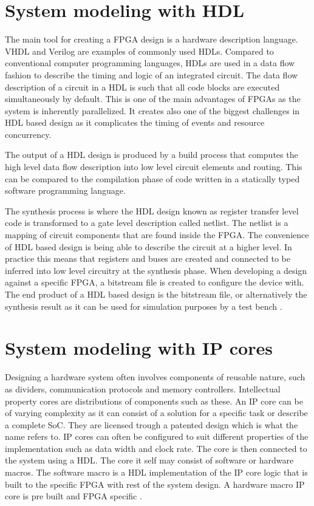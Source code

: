 \documentclass[12pt]{report}
\begin{document}
\section{System modeling with HDL}
The main tool for creating a FPGA design is a hardware description language. VHDL and Verilog are examples of commonly used HDLs. Compared to conventional computer programming languages, HDLs are used in a data flow fashion to describe the timing and logic of an integrated circuit. The data flow description of a circuit in a HDL is such that all code blocks are executed simultaneously by default. This is one of the main advantages of FPGAs as the system is inherently parallelized. It creates also one of the biggest challenges in HDL based design as it complicates the timing of events and resource concurrency.
\par
The output of a HDL design is produced by a build process that computes the high level data flow description into low level circuit elements and routing. This can be compared to the compilation phase of code written in a statically typed software programming language. 
\par
The synthesis process is where the HDL design known as register transfer level code is transformed to a gate level description called netlist. The netlist is a mapping of circuit components that are found inside the FPGA. The convenience of HDL based design is being able to describe the circuit at a higher level. In practice this means that registers and buses are created and connected to be inferred into low level circuitry at the synthesis phase. When developing a design against a specific FPGA, a bitstream file is created to configure the device with. The end product of a HDL based design is the bitstream file, or alternatively the synthesis result as it can be used for simulation purposes by a test bench \citep{XilVivado}.

\section{System modeling with IP cores}
Designing a hardware system often involves components of reusable nature, such as dividers, communication protocols and memory controllers. Intellectual property cores are distributions of components such as these. An IP core can be of varying complexity as it can consist of a solution for a specific task or describe a complete SoC. They are licensed trough a patented design which is what the name refers to. IP cores can often be configured to suit different properties of the implementation such as data width and clock rate. The core is then connected to the system using a HDL. The core it self may consist of software or hardware macros. The software macro is a HDL implementation of the IP core logic that is built to the specific FPGA with rest of the system design. A hardware macro IP core is pre built and FPGA specific \citep{EERefBook} \citep{XilVivado}.
\end{document}
